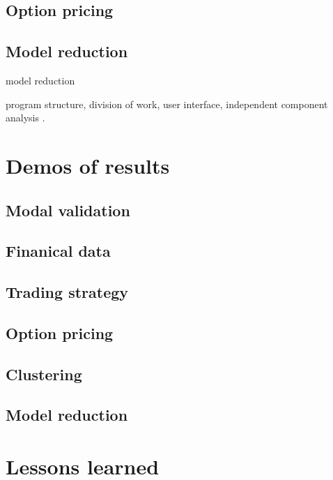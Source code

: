 \documentclass[12pt,a4paper]{article}
\begin{document}
\subsection{Option pricing}





\subsection{Model reduction}
model reduction

program structure, division of work, user interface, 
independent component analysis \cite{hyvarinen2000independent}.

\section{Demos of results}
\subsection{Modal validation}
\subsection{Finanical data}
\subsection{Trading strategy}
\subsection{Option pricing}
\subsection{Clustering}
\subsection{Model reduction}

\section{Lessons learned}


\end{document}
